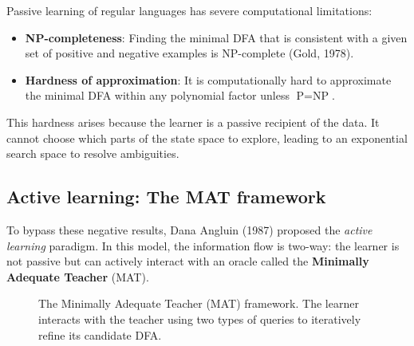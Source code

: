 Passive learning of regular languages has severe computational limitations:
\begin{itemize}
  \item \textbf{NP-completeness}: Finding the minimal DFA that is consistent with a given set of positive and negative examples is NP-complete (Gold, 1978).
  \item \textbf{Hardness of approximation}: It is computationally hard to approximate the minimal DFA within any polynomial factor unless $\text{P} = \text{NP}$.
\end{itemize}
This hardness arises because the learner is a passive recipient of the data. It cannot choose which parts of the state space to explore, leading to an exponential search space to resolve ambiguities.

\subsection{Active learning: The MAT framework}

To bypass these negative results, Dana Angluin (1987) proposed the \emph{active learning} paradigm. In this model, the information flow is two-way: the learner is not passive but can actively interact with an oracle called the \textbf{Minimally Adequate Teacher} (MAT). 

\begin{figure}[H]
  \centering
  \caption{The Minimally Adequate Teacher (MAT) framework. The learner interacts with the teacher using two types of queries to iteratively refine its candidate DFA.}
  \label{fig:mat-framework}
\end{figure}

